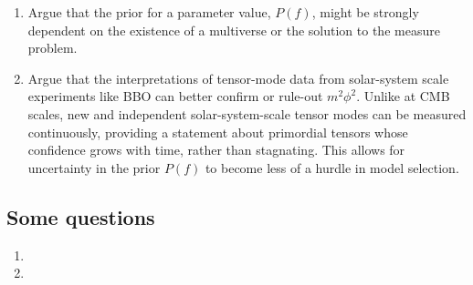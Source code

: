\documentclass[aps,amsfonts,amsmath,prd,preprint,nofootinbib,superscriptaddress]{revtex4}
\begin{document}
\begin{appendix}
\begin{enumerate}
\item Argue that the prior for a parameter value, $P(f)$, might be strongly dependent on the existence of a multiverse or the solution to the measure problem.


\item Argue that the interpretations of tensor-mode data from solar-system scale experiments like BBO can better confirm or rule-out $m^2\phi^2$.  Unlike at CMB scales, new and independent solar-system-scale tensor modes can be measured continuously, providing a statement about primordial tensors whose confidence grows with time, rather than stagnating.  This allows for uncertainty in the prior $P(f)$ to become less of a hurdle in model selection.


\end{enumerate}

\subsection{Some questions}
 
 \begin{enumerate}
 \item
 \item 
 \end{enumerate}





\end{appendix}




  
\end{document}
